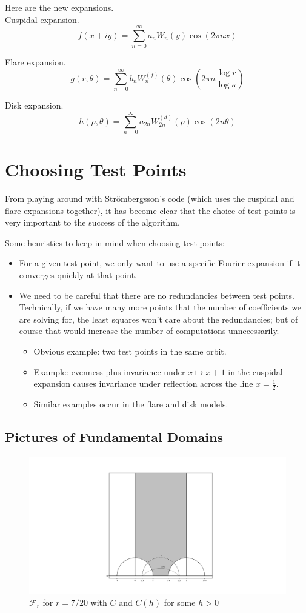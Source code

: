 \documentclass[]{article}
\begin{document}
Here are the new expansions.
\\

Cuspidal expansion.
$$
f(x + iy) = \sum_{n = 0}^{\infty}a_nW_n(y)\cos(2\pi nx)
$$

Flare expansion.
$$
g(r, \theta) =
\sum_{n=0}^{\infty}b_nW_n^{(f)}(\theta)\cos\left( 2\pi n\frac{\log r}{\log\kappa} \right)
$$

Disk expansion.
$$
h(\rho, \theta) = \sum_{n = 0}^{\infty}a_{2n}W_{2n}^{(d)}(\rho)\cos(2n\theta)
$$

\section*{Choosing Test Points}

From playing around with Str\"ombergsson's code (which uses the cuspidal and flare expansions together), it has become clear that the choice of test points is very important to the success of the algorithm.

Some heuristics to keep in mind when choosing test points:
\begin{itemize}
	\item For a given test point, we only want to use a specific Fourier expansion if it converges quickly at that point.
	\item We need to be careful that there are no redundancies between test points.
	Technically, if we have many more points that the number of coefficients we are solving for, the least squares won't care about the redundancies; but of course that would increase the number of computations unnecessarily.
	\begin{itemize}
		\item Obvious example: two test points in the same orbit.
		\item Example: evenness plus invariance under $x \mapsto x + 1$ in the cuspidal expansion causes invariance under reflection across the line $x = \frac{1}{2}$.
		\item Similar examples occur in the flare and disk models.
	\end{itemize}
\end{itemize}

\subsection*{Pictures of Fundamental Domains}

\begin{figure}[h]
	\centering
	\includegraphics[trim=400 60 380 80, clip, width=0.6\linewidth]{F_r_with_Cs.pdf}
	\caption{$\mathcal{F}_r$ for $r = 7/20$ with $C$ and $C(h)$ for some $h > 0$}
	\label{FrWithCs}
\end{figure}
\end{document}
